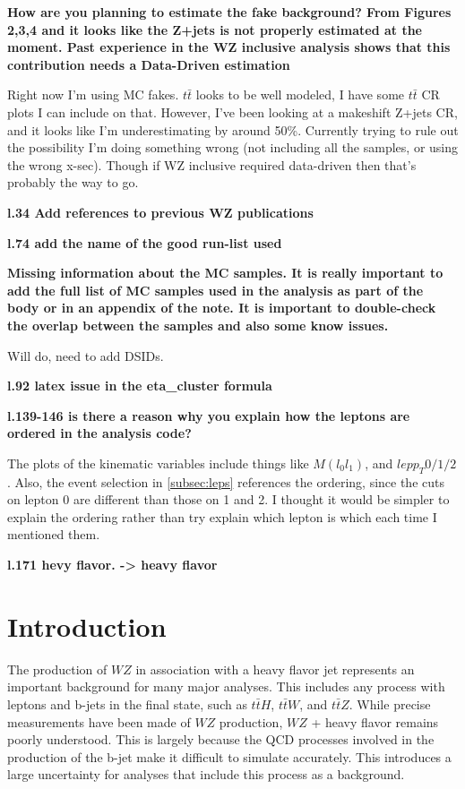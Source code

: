 \documentclass[NOTE, atlasdraft=true, texlive=2016, UKenglish]{\ATLASLATEXPATH atlasdoc}
\begin{document}
\textbf{How are you planning to estimate the fake background? From Figures 2,3,4 and it looks like the Z+jets is not properly estimated at the moment. Past experience in the WZ inclusive analysis shows that this contribution needs a Data-Driven estimation}

Right now I'm using MC fakes. $t\bar{t}$ looks to be well modeled, I have some $t\bar{t}$ CR plots I can include on that. However, I've been looking at a makeshift Z+jets CR, and it looks like I'm underestimating by around 50\%. Currently trying to rule out the possibility I'm doing something wrong (not including all the samples, or using the wrong x-sec). Though if WZ inclusive required data-driven then that's probably the way to go. 

\textbf{l.34 Add references to previous WZ publications}

\textbf{l.74 add the name of the good run-list used} \checkmark

\textbf{Missing information about the MC samples. It is really important to add the full list of MC samples used in the analysis as part of the body or in an appendix of the note. It is important to double-check the overlap between the samples and also some know issues.}

Will do, need to add DSIDs. 

\textbf{l.92 latex issue in the eta\_cluster formula} \checkmark

\textbf{l.139-146 is there a reason why you explain how the leptons are ordered in the analysis code?}
 
The plots of the kinematic variables include things like $M(l_0l_1)$, and $lep p_T 0/1/2$. Also, the event selection in \ref{subsec:leps} references the ordering, since the cuts on lepton 0 are different than those on 1 and 2. I thought it would be simpler to explain the ordering rather than try explain which lepton is which each time I mentioned them.

\textbf{l.171  hevy flavor. -> heavy flavor} \checkmark

\clearpage

\section{Introduction}
\label{sec:intro}

The production of $WZ$ in association with a heavy flavor jet represents an important background for many major analyses. This includes any process with leptons and b-jets in the final state, such as $t\bar{t}H$, $t\bar{t}W$, and $t\bar{t}Z$. While precise measurements have been made of $WZ$ production, $WZ$ + heavy flavor remains poorly understood. This is largely because the QCD processes involved in the production of the b-jet make it difficult to simulate accurately. This introduces a large uncertainty for analyses that include this process as a background.  
\end{document}

